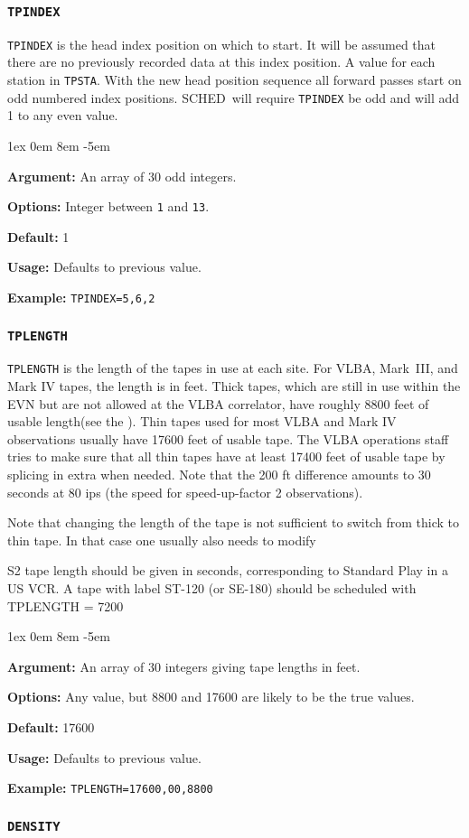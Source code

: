 \documentclass{report}
\newcommand{\schedb}{{\sc SCHED~}}
\newcommand{\rcwbox}[5]{
  \begin{list}{}{\parsep 1ex  \itemsep 0em
                 \leftmargin 8em  \itemindent -5em }
    \item {\bf Argument:} #1
    \item {\bf Options:}  #2
    \item {\bf Default:}  #3
    \item {\bf Usage:}    #4
    \item {\bf Example:}  #5
  \end{list}
}
\begin{document}
\subsubsection{\label{TP:TPINDEX}{\tt TPINDEX}}

{\tt TPINDEX} is the head index position on which to start. It will
be assumed that there are no previously recorded data at this index
position. A value for each station in {\tt TPSTA}. With the new head
position sequence all forward passes start on odd numbered index
positions. \schedb will require {\tt TPINDEX} be odd and will add
1 to any even value.

\rcwbox
{An array of 30 odd integers.}
{Integer between {\tt 1} and {\tt 13}.}
{1}
{Defaults to previous value.}
{{\tt TPINDEX=5,6,2}}

\subsubsection{\label{TP:TPLENGTH}{\tt TPLENGTH}}

{\tt TPLENGTH} is the length of the tapes in use at each site.  For
VLBA, Mark~III, and Mark IV tapes, the length is in feet.  Thick
tapes, which are still in use within the EVN but are not allowed at
the VLBA correlator, have roughly 8800 feet of usable length(see
the ).  Thin
tapes used for most VLBA and Mark IV observations usually have 17600
feet of usable tape.  The VLBA operations staff tries to make sure
that all thin tapes have at least 17400 feet of usable tape by
splicing in extra when needed.  Note that the 200 ft difference
amounts to 30 seconds at 80 ips (the speed for speed-up-factor 2
observations).

Note that changing the length of the tape is not sufficient to switch
from thick to thin tape. In that case one usually also needs to modify

S2 tape length should be given in seconds, corresponding to Standard
Play in a US VCR. A tape with label ST-120 (or SE-180) should be
scheduled with TPLENGTH = 7200


\rcwbox
{An array of 30 integers giving tape lengths in feet.}
{Any value, but 8800 and 17600 are likely to be the true values.}
{17600}
{Defaults to previous value.}
{{\tt TPLENGTH=17600,00,8800}}

\subsubsection{\label{TP:DENSITY}{\tt DENSITY}}
\end{document}
